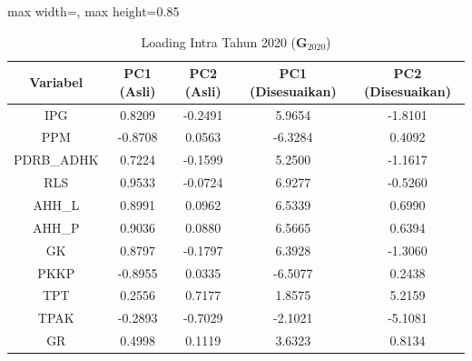 \begin{table}[H]
\centering
\caption{Loading Intra Tahun 2020 ($\mathbf{G}_{2020}$)} \label{tab:app1loading_intra_2020}
\begin{adjustbox}{max width=\textwidth, max height=0.85\textheight}
\begin{tabular}{|c|c|c|c|c|}
\hline
\textbf{Variabel} & \textbf{PC1 (Asli)} & \textbf{PC2 (Asli)} & \textbf{PC1 (Disesuaikan)} & \textbf{PC2 (Disesuaikan)} \\
\hline
IPG & 0.8209 & -0.2491 & 5.9654 & -1.8101 \\
PPM & -0.8708 & 0.0563 & -6.3284 & 0.4092 \\
PDRB\_ADHK & 0.7224 & -0.1599 & 5.2500 & -1.1617 \\
RLS & 0.9533 & -0.0724 & 6.9277 & -0.5260 \\
AHH\_L & 0.8991 & 0.0962 & 6.5339 & 0.6990 \\
AHH\_P & 0.9036 & 0.0880 & 6.5665 & 0.6394 \\
GK & 0.8797 & -0.1797 & 6.3928 & -1.3060 \\
PKKP & -0.8955 & 0.0335 & -6.5077 & 0.2438 \\
TPT & 0.2556 & 0.7177 & 1.8575 & 5.2159 \\
TPAK & -0.2893 & -0.7029 & -2.1021 & -5.1081 \\
GR & 0.4998 & 0.1119 & 3.6323 & 0.8134 \\
\hline
\end{tabular}
\end{adjustbox}
\end{table}